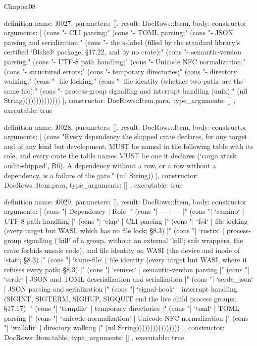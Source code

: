 \begin{lexlean}{Chapter08}
\begin{semanticmodule}
definition{
  name: i0027,
  parameters: [],
  result: DocRows::Item,
  body: constructor{
    arguments: [
      (cons "- CLI parsing;" (cons "- TOML parsing;" (cons "- JSON parsing and serialization;" (cons "- the κ-label (filled by the standard library's certified `Blake3` package, §17.22, and by no crate);" (cons "- semantic-version parsing;" (cons "- UTF-8 path handling;" (cons "- Unicode NFC normalization;" (cons "- structured errors;" (cons "- temporary directories;" (cons "- directory walking;" (cons "- file locking;" (cons "- file identity (whether two paths are the same file);" (cons "- process-group signalling and interrupt handling (unix)." (nil String))))))))))))))
    ],
    constructor: DocRows::Item.para,
    type_arguments: []
  },
  executable: true
}

definition{
  name: i0028,
  parameters: [],
  result: DocRows::Item,
  body: constructor{
    arguments: [
      (cons "Every dependency the shipped crate declares, for any target and of any kind but development, MUST be named in the following table with its role, and every crate the table names MUST be one it declares (`cargo xtask audit-shipped`, R6). A dependency without a row, or a row without a dependency, is a failure of the gate." (nil String))
    ],
    constructor: DocRows::Item.para,
    type_arguments: []
  },
  executable: true
}

definition{
  name: i0029,
  parameters: [],
  result: DocRows::Item,
  body: constructor{
    arguments: [
      (cons "| Dependency | Role |" (cons "| --- | --- |" (cons "| `camino` | UTF-8 path handling |" (cons "| `clap` | CLI parsing |" (cons "| `fs4` | file locking (every target but WASI, which has no file lock; §8.3) |" (cons "| `rustix` | process-group signalling (`kill` of a group, without an external `kill`; safe wrappers, the crate forbids unsafe code), and file identity on WASI (the device and inode of `stat`; §8.3) |" (cons "| `same-file` | file identity (every target but WASI, where it refuses every path; §8.3) |" (cons "| `semver` | semantic-version parsing |" (cons "| `serde` | JSON and TOML deserialization and serialization |" (cons "| `serde_json` | JSON parsing and serialization |" (cons "| `signal-hook` | interrupt handling (SIGINT, SIGTERM, SIGHUP, SIGQUIT end the live child process groups; §17.17) |" (cons "| `tempfile` | temporary directories |" (cons "| `toml` | TOML parsing |" (cons "| `unicode-normalization` | Unicode NFC normalization |" (cons "| `walkdir` | directory walking |" (nil String))))))))))))))))
    ],
    constructor: DocRows::Item.table,
    type_arguments: []
  },
  executable: true
}


\end{semanticmodule}
\end{lexlean}
